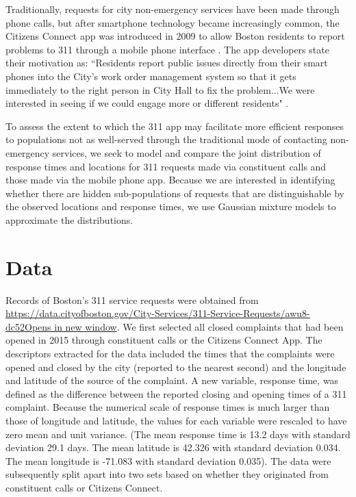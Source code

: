 \documentclass[twoside]{article}
\theoremstyle{theorem}
\theoremstyle{theorem}
\theoremstyle{theorem}
\theoremstyle{lemma}
\theoremstyle{definition}
\theoremstyle{example}
\begin{document}
Traditionally, requests for city non-emergency services have been made through phone calls, but after smartphone technology became increasingly common, the Citizens Connect app was introduced in 2009 to allow Boston residents to report problems to 311 through a mobile phone interface \cite{newurbanmechanics}. The app developers state their motivation as: ``Residents report public issues directly from their smart phones into the City's work order management system so that it gets immediately to the right person in City Hall to fix the problem...We were interested in seeing if we could engage more or different residents" \cite{newurbanmechanics}.  

To assess the extent to which the 311 app may facilitate more efficient responses to populations not as well-served through the traditional mode of contacting non-emergency services, we seek to model and compare the joint distribution of response times and locations for 311 requests made via constituent calls and those made via the mobile phone app. Because we are interested in identifying whether there are hidden sub-populations of requests that are distinguishable by the observed locations and response times, we use Gaussian mixture models to approximate the distributions. 
\section{Data}
Records of Boston's 311 service requests were obtained from \url{https://data.cityofboston.gov/City-Services/311-Service-Requests/awu8-dc52Opens in new window}. We first selected all closed complaints that had been opened in 2015 through constituent calls or the Citizens Connect App. The descriptors extracted for the data included the times that the complaints were opened and closed by the city (reported to the nearest second) and the longitude and latitude of the source of the complaint. A new variable, response time, was defined as the difference between the reported closing and opening times of a 311 complaint. Because the numerical scale of response times is much larger than those of longitude and latitude, the values for each variable were rescaled to have zero mean and unit variance. (The mean response time is 13.2 days with standard deviation 29.1 days. The mean latitude is 42.326 with standard deviation 0.034. The mean longitude is -71.083 with standard deviation 0.035). The data were subsequently split apart into two sets based on whether they originated from constituent calls or Citizens Connect. 
\end{document}
